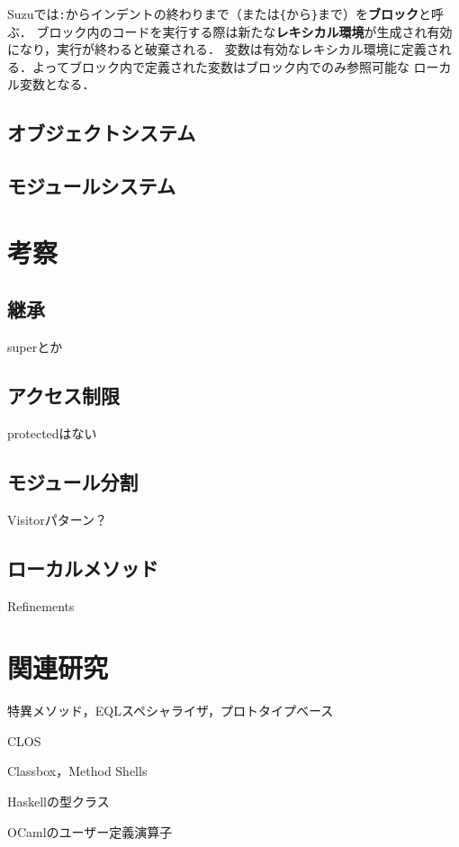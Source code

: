 \documentclass[a4paper,11pt,dvipdfmx]{jreport}
\begin{document}
Suzuでは\verb|:|からインデントの終わりまで（または\verb|{|から\verb|}|まで）を\textbf{ブロック}と呼ぶ．
ブロック内のコードを実行する際は新たな\textbf{レキシカル環境}が生成され有効になり，実行が終わると破棄される．
変数は有効なレキシカル環境に定義される．よってブロック内で定義された変数はブロック内でのみ参照可能な
ローカル変数となる．


\section{オブジェクトシステム}

\section{モジュールシステム}


\chapter{考察}
\label{chapter:discussion}

\section{継承}
superとか

\section{アクセス制限}
protectedはない

\section{モジュール分割}
Visitorパターン？

\section{ローカルメソッド}
Refinements

\chapter{関連研究}
\label{chapter:related-work}

特異メソッド，EQLスペシャライザ，プロトタイプベース

CLOS

Classbox，Method Shells

Haskellの型クラス

OCamlのユーザー定義演算子
\end{document}
